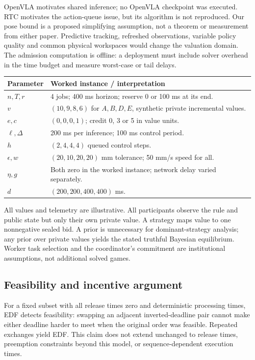 OpenVLA motivates shared inference; no OpenVLA checkpoint was executed. RTC motivates the action-queue issue, but its algorithm is not reproduced. Our pose bound is a proposed simplifying assumption, not a theorem or measurement from either paper. Predictive tracking, refreshed observations, variable policy quality and common physical workspaces would change the valuation domain. The admission computation is offline: a deployment must include solver overhead in the time budget and measure worst-case or tail delays.

\begin{center}\small
\begin{tabularx}{\columnwidth}{lY}\toprule
Parameter & Worked instance / interpretation\\\midrule
$n,T,r$ & 4 jobs; 400 ms horizon; reserve 0 or 100 ms at its end.\\
$v$ & $(10,9,8,6)$ for $A,B,D,E$, synthetic private incremental values.\\
$e,c$ & $(0,0,0,1)$; credit 0, 3 or 5 in value units.\\
$\ell,\Delta$ & 200 ms per inference; 100 ms control period.\\
$h$ & $(2,4,4,4)$ queued control steps.\\
$\epsilon,w$ & $(20,10,20,20)$ mm tolerance; 50 mm/s speed for all.\\
$\eta,g$ & Both zero in the worked instance; network delay varied separately.\\
$d$ & $(200,200,400,400)$ ms.\\\bottomrule
\end{tabularx}
\end{center}
All values and telemetry are illustrative. All participants observe the rule and public state but only their own private value. A strategy maps value to one nonnegative sealed bid. A prior is unnecessary for dominant-strategy analysis; any prior over private values yields the stated truthful Bayesian equilibrium. Worker task selection and the coordinator's commitment are institutional assumptions, not additional solved games.

\subsection{Feasibility and incentive argument}
For a fixed subset with all release times zero and deterministic processing times, EDF detects feasibility: swapping an adjacent inverted-deadline pair cannot make either deadline harder to meet when the original order was feasible. Repeated exchanges yield EDF. This claim does not extend unchanged to release times, preemption constraints beyond this model, or sequence-dependent execution times.


